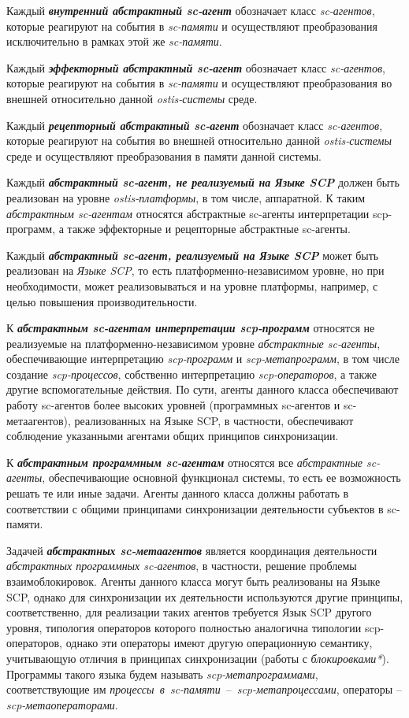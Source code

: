 Каждый \textbf{\textit{внутренний абстрактный sc-агент}} обозначает класс \textit{sc-агентов}, которые реагируют на события в \textit{sc-памяти} и осуществляют преобразования исключительно в рамках этой же \textit{sc-памяти}.

Каждый \textbf{\textit{эффекторный абстрактный sc-агент}} обозначает класс \textit{sc-агентов}, которые реагируют на события в \textit{sc-памяти} и осуществляют преобразования во внешней относительно данной \textit{ostis-системы} среде.

Каждый \textbf{\textit{рецепторный абстрактный sc-агент}} обозначает класс \textit{sc-агентов}, которые реагируют на события во внешней относительно данной \textit{ostis-системы} среде и осуществляют преобразования в памяти данной системы.

Каждый \textbf{\textit{абстрактный sc-агент, не реализуемый на Языке SCP}} должен быть реализован на уровне \textit{ostis-платформы}, в том числе, аппаратной. К таким \textit{абстрактным sc-агентам} относятся абстрактные sc-агенты интерпретации scp-программ, а также эффекторные и рецепторные абстрактные sc-агенты.

Каждый \textbf{\textit{абстрактный sc-агент, реализуемый на Языке SCP}} может быть реализован на \textit{Языке SCP}, то есть платформенно-независимом уровне, но при необходимости, может реализовываться и на уровне платформы, например, с целью повышения производительности.

К \textbf{\textit{абстрактным sc-агентам интерпретации scp-программ}} относятся не реализуемые на платформенно-независимом уровне \textit{абстрактные sc-агенты}, обеспечивающие интерпретацию \textit{scp-программ} и \textit{\mbox{scp-метапрограмм}}, в том числе создание \textit{scp-процессов}, собственно интерпретацию \textit{scp-операторов}, а также другие вспомогательные действия. По сути, агенты данного класса обеспечивают работу sc-агентов более высоких уровней (программных sc-агентов и sc-метаагентов), реализованных на Языке SCP, в частности, обеспечивают соблюдение указанными агентами общих принципов синхронизации.

К \textbf{\textit{абстрактным программным sc-агентам}} относятся все \textit{абстрактные sc-агенты}, обеспечивающие основной функционал системы, то есть ее возможность решать те или иные задачи. Агенты данного класса должны работать в соответствии с общими принципами синхронизации деятельности субъектов в sc-памяти.

Задачей \textbf{\textit{абстрактных sc-метаагентов}} является координация деятельности \textit{абстрактных программных sc-агентов}, в частности, решение проблемы взаимоблокировок. Агенты данного класса могут быть реализованы на Языке SCP, однако для синхронизации их деятельности используются другие принципы, соответственно, для реализации таких агентов требуется Язык SCP другого уровня, типология операторов которого полностью аналогична типологии scp-операторов, однако эти операторы имеют другую операционную семантику, учитывающую отличия в принципах синхронизации (работы с \textit{блокировками*}). Программы такого языка будем называть \textit{scp-метапрограммами}, соответствующие им \mbox{\textit{процессы в sc-памяти} -- \textit{scp-метапроцессами}}, операторы -- \textit{scp-метаоператорами}.

